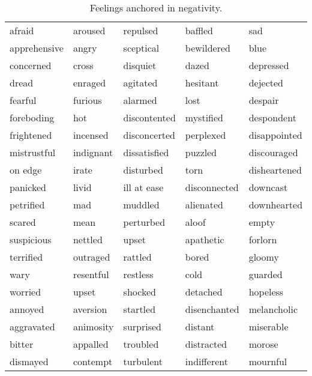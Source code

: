\begin{small}
        \begin{longtable}{ p{} p{}  p{}  p{}  p{} }
                \caption{Feelings anchored in negativity.}\label{table:feelings-negative}\\[-.5em]
                \toprule
                afraid & aroused & repulsed & baffled & sad \\
                apprehensive & angry & sceptical & bewildered & blue \\
                concerned & cross & disquiet & dazed & depressed \\
                dread & enraged & agitated & hesitant & dejected \\
                fearful & furious & alarmed & lost & despair \\
                foreboding & hot & discontented & mystified & despondent \\
                frightened & incensed & disconcerted & perplexed & disappointed \\
                mistrustful & indignant & dissatisfied & puzzled & discouraged \\
                on edge & irate & disturbed & torn & disheartened \\
                panicked & livid & ill at ease & disconnected & downcast \\
                petrified & mad & muddled & alienated & downhearted \\
                scared & mean & perturbed & aloof & empty \\
                suspicious & nettled & upset & apathetic & forlorn \\
                terrified & outraged & rattled & bored & gloomy \\
                wary & resentful & restless & cold & guarded \\
                worried & upset & shocked & detached & hopeless \\
                annoyed & aversion & startled & disenchanted & melancholic \\
                aggravated & animosity & surprised & distant & miserable \\
                bitter & appalled & troubled & distracted & morose \\
                dismayed & contempt & turbulent & indifferent & mournful \\

\end{longtable}
\end{small}

